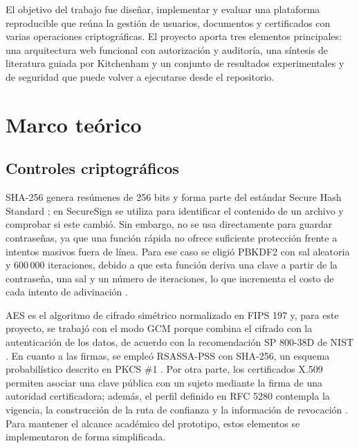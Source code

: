 \documentclass[conference]{IEEEtran}
\begin{document}
El objetivo del trabajo fue diseñar, implementar y evaluar una plataforma reproducible que reúna la gestión de usuarios, documentos y certificados con varias operaciones criptográficas. El proyecto aporta tres elementos principales: una arquitectura web funcional con autorización y auditoría, una síntesis de literatura guiada por Kitchenham y un conjunto de resultados experimentales y de seguridad que puede volver a ejecutarse desde el repositorio.

\section{Marco teórico}
\subsection{Controles criptográficos}
SHA-256 genera resúmenes de 256 bits y forma parte del estándar Secure Hash Standard \cite{fips180}; en SecureSign se utiliza para identificar el contenido de un archivo y comprobar si este cambió. Sin embargo, no se usa directamente para guardar contraseñas, ya que una función rápida no ofrece suficiente protección frente a intentos masivos fuera de línea. Para ese caso se eligió PBKDF2 con sal aleatoria y 600\,000 iteraciones, debido a que esta función deriva una clave a partir de la contraseña, una sal y un número de iteraciones, lo que incrementa el costo de cada intento de adivinación \cite{nist800132,rfc8018}.

AES es el algoritmo de cifrado simétrico normalizado en FIPS 197 \cite{fips197} y, para este proyecto, se trabajó con el modo GCM porque combina el cifrado con la autenticación de los datos, de acuerdo con la recomendación SP 800-38D de NIST \cite{nist80038d}. En cuanto a las firmas, se empleó RSASSA-PSS con SHA-256, un esquema probabilístico descrito en PKCS \#1 \cite{rfc8017}. Por otra parte, los certificados X.509 permiten asociar una clave pública con un sujeto mediante la firma de una autoridad certificadora; además, el perfil definido en RFC 5280 contempla la vigencia, la construcción de la ruta de confianza y la información de revocación \cite{rfc5280}. Para mantener el alcance académico del prototipo, estos elementos se implementaron de forma simplificada.
\end{document}
